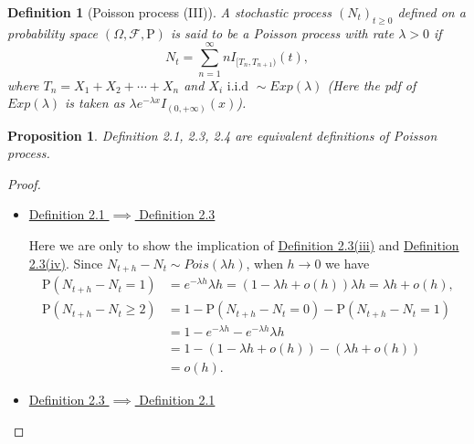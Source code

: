 \documentclass{article}
\newtheorem{definition}{Definition}[section]
\newtheorem{proposition}{Proposition}[section]
\theoremstyle{nonumberplain}
\newtheorem{proof}{Proof.}
\begin{document}
\begin{definition}[Poisson process (III)]
	A stochastic process $(N_t)_{t\ge0}$ defined on a probability space $(\Omega,\mathcal{F},\mathrm{P})$ is said to be a \emph{Poisson process} with rate $\lambda>0$ if
	\[
	N_t=\sum_{n=1}^{\infty}nI_{[T_n,T_{n+1})}(t),
	\]
	where $T_n=X_1+X_2+\cdots+X_n$ and $X_i\text{ i.i.d }\sim Exp(\lambda)$ (Here the pdf of $Exp(\lambda)$ is taken as $\lambda e^{-\lambda x}I_{(0,+\infty)}(x)$).
\end{definition}

\begin{proposition}
	Definition 2.1, 2.3, 2.4 are equivalent definitions of Poisson process.
\end{proposition}
\begin{proof}~\\
	\vspace{-1em}
	\begin{itemize}
	\item \underline{Definition 2.1 $\implies$ Definition 2.3} 
	
	Here we are only to show the implication of \hyperlink{Definition 2.3(iii)}{Definition 2.3(iii)} and \hyperlink{Definition 2.3(iv)}{Definition 2.3(iv)}. Since $N_{t+h}-N_t\sim Pois(\lambda h)$, when $h\to0$ we have 
	\begin{align*}
		\mathrm{P}(N_{t+h}-N_t=1)&=e^{-\lambda h}\lambda h=(1-\lambda h+o(h))\lambda h=\lambda h+o(h),\\
		\mathrm{P}(N_{t+h}-N_t\ge2)&=1-\mathrm{P}(N_{t+h}-N_t=0)-\mathrm{P}(N_{t+h}-N_t=1)\\
		&=1-e^{-\lambda h}-e^{-\lambda h}\lambda h\\
		&=1-(1-\lambda h+o(h))-(\lambda h+o(h))\\
		&=o(h).
	\end{align*}
	\item\underline{Definition 2.3 $\implies$ Definition 2.1} 
	

\end{itemize}
\end{proof}
\end{document}
